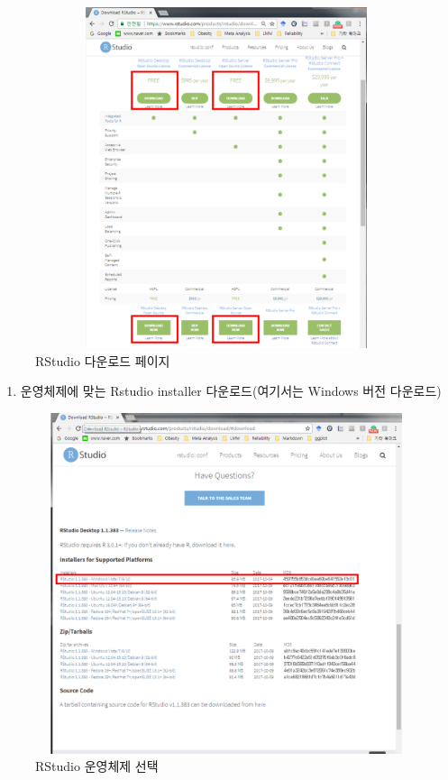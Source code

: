 \documentclass[12pt,a4paper]{book}
\providecommand{\tightlist}{%
  \setlength{\itemsep}{0pt}\setlength{\parskip}{0pt}}
\theoremstyle{definition}
\theoremstyle{definition}
\theoremstyle{definition}
\theoremstyle{remark}
\begin{document}
\begin{figure}[H]
{
  \centering
  \includegraphics[width = 12cm, height = 10cm]{Figures/Rstudio-download.png}
  \caption[RStudio 다운로드 페이지]{RStudio 다운로드 페이지}\label{fig:Rstudio-install-02}
}
\end{figure}

\begin{enumerate}
\def\labelenumi{\arabic{enumi}.}
\setcounter{enumi}{2}
\tightlist
\item
  운영체제에 맞는 Rstudio installer 다운로드(여기서는 Windows 버전
  다운로드)
\end{enumerate}

\begin{figure}[H]
{
  \centering
  \includegraphics[width = 12cm, height = 10cm]{Figures/Rstudio-download-02.png}
  \caption[RStudio 운영체제 선택]{RStudio 운영체제 선택}\label{fig:Rstudio-install-03}
}
\end{figure}
\end{document}
